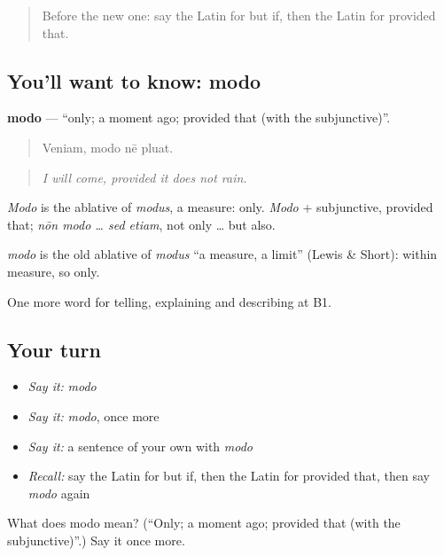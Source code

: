 \label{lesson:LA-C390-modo}



\begin{quote}
Before the new one: say the Latin for but if, then the Latin for provided that.
\end{quote}

\subsection*{You'll want to know: modo}
\textbf{modo} — \textquotedblleft{}only; a moment ago; provided that (with the subjunctive)\textquotedblright{}.

\begin{quote}
Veniam, modo nē pluat.
\end{quote}

\begin{quote}
\emph{I will come, provided it does not rain.}
\end{quote}

\emph{Modo} is the ablative of \emph{modus}, a measure: only. \emph{Modo} + subjunctive, provided that; \emph{nōn modo … sed etiam}, not only … but also.

\begin{cousinweb}
\emph{modo} is the old ablative of \emph{modus} \textquotedblleft{}a measure, a limit\textquotedblright{} (Lewis \& Short): within measure, so only.
\end{cousinweb}

\begin{grammarlens}[title={What you've built}]
One more word for telling, explaining and describing at B1.
\end{grammarlens}

\subsection*{Your turn}
\begin{itemize}
\raggedright
  \item \emph{Say it:} \emph{modo}
  \item \emph{Say it:} \emph{modo}, once more
  \item \emph{Say it:} a sentence of your own with \emph{modo}
  \item \emph{Recall:} say the Latin for but if, then the Latin for provided that, then say \emph{modo} again
\end{itemize}

\begin{tcolorbox}[breakable,colback=teal!4,colframe=teal!35!black,title={Before you move on}]
What does modo mean? (\textquotedblleft{}Only; a moment ago; provided that (with the subjunctive)\textquotedblright{}.) Say it once more.
\end{tcolorbox}
